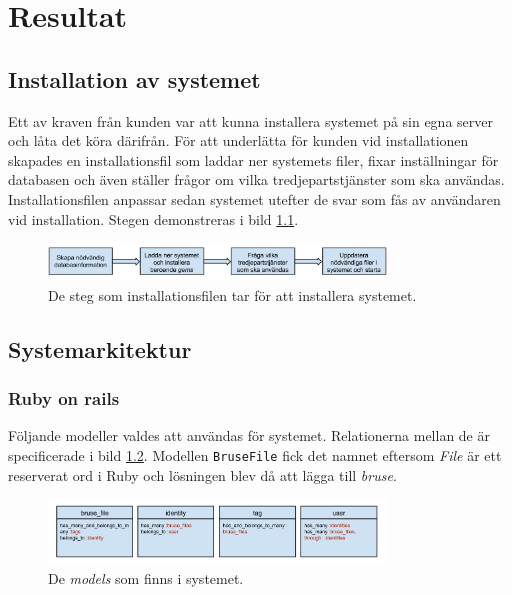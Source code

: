 \chapter{Resultat}

\section{Installation av systemet}
Ett av kraven från kunden var att kunna installera systemet på sin egna server
och låta det köra därifrån. För att underlätta för kunden vid installationen
skapades en installationsfil som laddar ner systemets filer, fixar inställningar
för databasen och även ställer frågor om vilka tredjepartstjänster som ska
användas. Installationsfilen anpassar sedan systemet utefter de svar som fås av
användaren vid installation. Stegen demonstreras i bild \ref{fig:installation}.

\begin{figure}[!h]
\centering
\includegraphics[width=0.8\textwidth]{figures/installation.png}
\caption{De steg som installationsfilen tar för att installera systemet.}
\label{fig:installation}
\end{figure}

\section{Systemarkitektur}

\subsection{Ruby on rails}
Följande modeller valdes att användas för systemet. Relationerna mellan de är
specificerade i bild \ref{fig:models}. Modellen \texttt{BruseFile} fick det namnet
eftersom \emph{File} är ett reserverat ord i Ruby och lösningen blev då att
lägga till \emph{bruse}.

\begin{figure}[!h]
\centering
\includegraphics[width=0.8\textwidth]{figures/models.png}
\caption{De \emph{models} som finns i systemet.}
\label{fig:models}
\end{figure}

